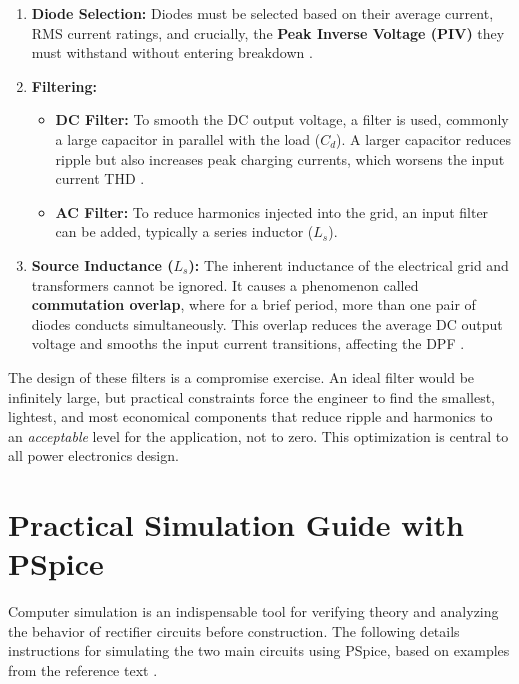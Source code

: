 \documentclass[12pt,a4paper]{article}
\begin{document}
\begin{enumerate}
    \item \textbf{Diode Selection:} Diodes must be selected based on their average current, RMS current ratings, and crucially, the \textbf{Peak Inverse Voltage (PIV)} they must withstand without entering breakdown \cite{rashid2014}.
    
    \item \textbf{Filtering:}
    \begin{itemize}
        \item \textbf{DC Filter:} To smooth the DC output voltage, a filter is used, commonly a large capacitor in parallel with the load ($C_d$). A larger capacitor reduces ripple but also increases peak charging currents, which worsens the input current THD \cite{rashid2014}.
        \item \textbf{AC Filter:} To reduce harmonics injected into the grid, an input filter can be added, typically a series inductor ($L_s$).
    \end{itemize}
    
    \item \textbf{Source Inductance ($L_s$):} The inherent inductance of the electrical grid and transformers cannot be ignored. It causes a phenomenon called \textbf{commutation overlap}, where for a brief period, more than one pair of diodes conducts simultaneously. This overlap reduces the average DC output voltage and smooths the input current transitions, affecting the DPF \cite{rashid2014, mohan2003}.
\end{enumerate}

The design of these filters is a compromise exercise. An ideal filter would be infinitely large, but practical constraints force the engineer to find the smallest, lightest, and most economical components that reduce ripple and harmonics to an \textit{acceptable} level for the application, not to zero. This optimization is central to all power electronics design.

\section{Practical Simulation Guide with PSpice}

Computer simulation is an indispensable tool for verifying theory and analyzing the behavior of rectifier circuits before construction. The following details instructions for simulating the two main circuits using PSpice, based on examples from the reference text \cite{rashid2014}.
\end{document}

